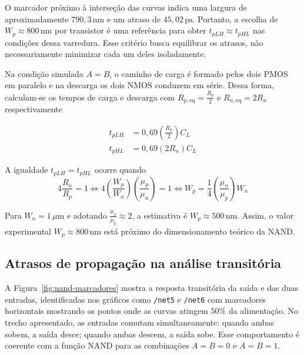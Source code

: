 \documentclass[a4paper]{article}
\begin{document}
O marcador próximo à interseção das curvas indica uma largura de aproximadamente $790{,}3\,\mathrm{nm}$ e um atraso de $45{,}02\,\mathrm{ps}$. Portanto, a escolha de $W_p \approx 800\,\mathrm{nm}$ por transistor é uma referência para obter $t_{pLH} \approx t_{pHL}$ nas condições dessa varredura. Esse critério busca equilibrar os atrasos, não necessariamente minimizar cada um deles isoladamente.

\begin{tcolorbox}[
    title={Estimativa teórica para a largura dos PMOS da NAND},
    colback=bleu303pale,
    colframe=bleu303,
    fonttitle=\bfseries
]
Na condição simulada $A=B$, o caminho de carga é formado pelos dois PMOS em paralelo e na descarga os dois NMOS conduzem em série. Dessa forma, calculam-se os tempos de carga e descarga com $R_{p,\text{eq}} = \frac{R_p}{2}$ e $R_{n,\text{eq}} = 2R_n$ respectivamente

\begin{align}
    t_{pLH} &= 0,69 \left(\frac{R_p}{2}\right) C_L \\
    t_{pHL} &= 0,69 (2R_n) C_L
\end{align}

A igualdade $t_{pLH} = t_{pHL}$ ocorre quando
\begin{equation}
    4 \frac{R_n}{R_p} = 1 \iff 4 \left(\frac{W_p}{W_n}\right) \left(\frac{\mu_p}{\mu_n}\right) = 1 \iff W_p = \frac{1}{4}  \left(\frac{\mu_n}{\mu_p}\right) W_n
\end{equation}

Para $W_n=1\,\mu\mathrm{m}$ e adotando $\frac{\mu_n}{\mu_p} \approx 2$, a estimativa é $W_p \approx 500 \,\mathrm{nm}$. Assim, o valor experimental $W_p\approx 800 \,\mathrm{nm}$ está próximo do dimensionamento teórico da NAND.
\end{tcolorbox}

\subsection{Atrasos de propagação na análise transitória}

A Figura~\ref{fig:nand-marcadores} mostra a resposta transitória da saída e das duas entradas, identificadas nos gráficos como \texttt{/net5} e \texttt{/net6} com marcadores horizontais mostrando os pontos onde as curvas atingem $50\%$ da alimentação. No trecho apresentado, as entradas comutam simultaneamente: quando ambas sobem, a saída desce; quando ambas descem, a saída sobe. Esse comportamento é coerente com a função NAND para as combinações $A=B=0$ e $A=B=1$.
\end{document}
